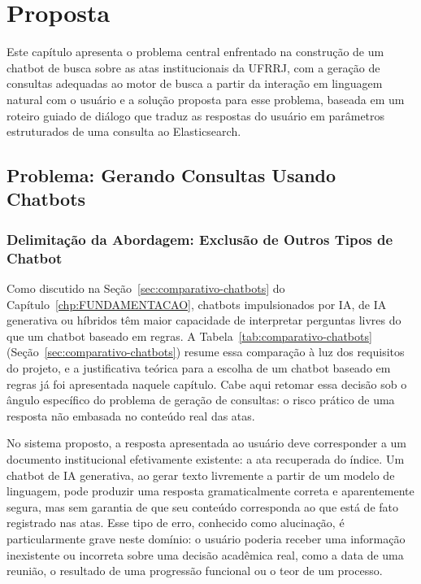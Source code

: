 \chapter{Proposta}\label{chp:PROPOSTA}

Este capítulo apresenta o problema central enfrentado na construção de um chatbot de busca sobre as atas institucionais da UFRRJ, com a geração de consultas adequadas ao motor de busca a partir da interação em linguagem natural com o usuário  e a solução proposta para esse problema, baseada em um roteiro guiado de diálogo que traduz as respostas do usuário em parâmetros estruturados de uma consulta ao Elasticsearch.

\section{Problema: Gerando Consultas Usando Chatbots}

\subsection{Delimitação da Abordagem: Exclusão de Outros Tipos de Chatbot}

Como discutido na Seção~\ref{sec:comparativo-chatbots} do Capítulo~\ref{chp:FUNDAMENTACAO}, chatbots impulsionados por IA, de IA generativa ou híbridos têm maior capacidade de interpretar perguntas livres do que um chatbot baseado em regras. A Tabela~\ref{tab:comparativo-chatbots} (Seção~\ref{sec:comparativo-chatbots}) resume essa comparação à luz dos requisitos do projeto, e a justificativa teórica para a escolha de um chatbot baseado em regras já foi apresentada naquele capítulo. Cabe aqui retomar essa decisão sob o ângulo específico do problema de geração de consultas: o risco prático de uma resposta não embasada no conteúdo real das atas.

No sistema proposto, a resposta apresentada ao usuário deve corresponder a um documento institucional efetivamente existente: a ata recuperada do índice. Um chatbot de IA generativa, ao gerar texto livremente a partir de um modelo de linguagem, pode produzir uma resposta gramaticalmente correta e aparentemente segura, mas sem garantia de que seu conteúdo corresponda ao que está de fato registrado nas atas. Esse tipo de erro, conhecido como alucinação, é particularmente grave neste domínio: o usuário poderia receber uma informação inexistente ou incorreta sobre uma decisão acadêmica real, como a data de uma reunião, o resultado de uma progressão funcional ou o teor de um processo.

